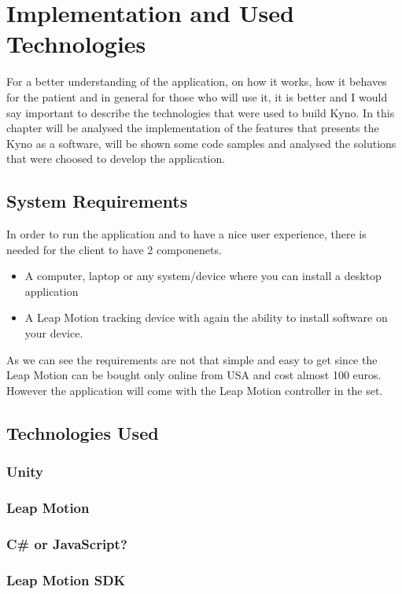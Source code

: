 \section{ Implementation and Used Technologies}

For a better understanding of the application, on how it works, how it behaves for the patient and in general for those who will use it, it is better and I would say important to describe the technologies that were used to build Kyno. In this chapter will be analysed the implementation of the features that presents the Kyno as a software, will be shown some code samples and analysed the solutions that were choosed to develop the application.

\subsection{System Requirements}
In order to run the application and to have a nice user experience, there is needed for the client to have 2 componenets.

\begin{itemize}
\item A computer, laptop or any system/device where you can install a desktop application

\item A Leap Motion tracking device with again the ability to install software on your device.
\end{itemize}

As we can see the requirements are not that simple and easy to get since the Leap Motion can be bought only online from USA and cost almost 100 euros. However the application will come with the Leap Motion controller in the set.

\subsection {Technologies Used}
\subsubsection {Unity}
\subsubsection {Leap Motion}
\subsubsection {C\# or JavaScript?}
\subsubsection {Leap Motion SDK}
